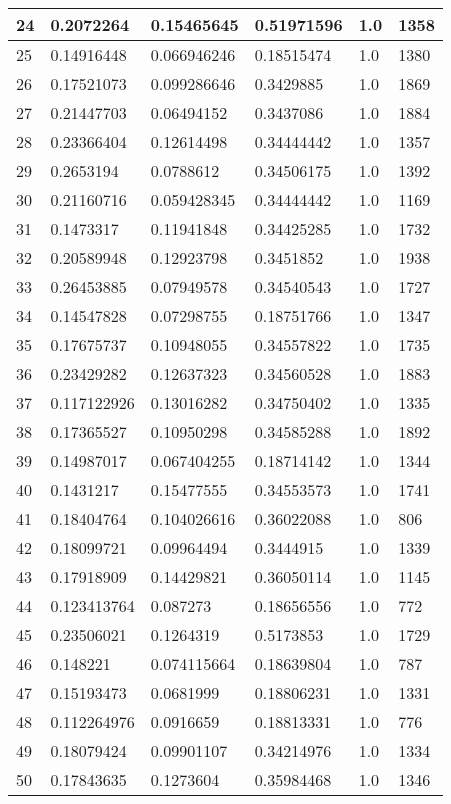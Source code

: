 \begin{longtable}{|l|l|l|l|l|l|}
24 & 0.2072264 & 0.15465645 & 0.51971596 & 1.0 & 1358 \\ \hline 
25 & 0.14916448 & 0.066946246 & 0.18515474 & 1.0 & 1380 \\ \hline 
26 & 0.17521073 & 0.099286646 & 0.3429885 & 1.0 & 1869 \\ \hline 
27 & 0.21447703 & 0.06494152 & 0.3437086 & 1.0 & 1884 \\ \hline 
28 & 0.23366404 & 0.12614498 & 0.34444442 & 1.0 & 1357 \\ \hline 
29 & 0.2653194 & 0.0788612 & 0.34506175 & 1.0 & 1392 \\ \hline 
30 & 0.21160716 & 0.059428345 & 0.34444442 & 1.0 & 1169 \\ \hline 
31 & 0.1473317 & 0.11941848 & 0.34425285 & 1.0 & 1732 \\ \hline 
32 & 0.20589948 & 0.12923798 & 0.3451852 & 1.0 & 1938 \\ \hline 
33 & 0.26453885 & 0.07949578 & 0.34540543 & 1.0 & 1727 \\ \hline 
34 & 0.14547828 & 0.07298755 & 0.18751766 & 1.0 & 1347 \\ \hline 
35 & 0.17675737 & 0.10948055 & 0.34557822 & 1.0 & 1735 \\ \hline 
36 & 0.23429282 & 0.12637323 & 0.34560528 & 1.0 & 1883 \\ \hline 
37 & 0.117122926 & 0.13016282 & 0.34750402 & 1.0 & 1335 \\ \hline 
38 & 0.17365527 & 0.10950298 & 0.34585288 & 1.0 & 1892 \\ \hline 
39 & 0.14987017 & 0.067404255 & 0.18714142 & 1.0 & 1344 \\ \hline 
40 & 0.1431217 & 0.15477555 & 0.34553573 & 1.0 & 1741 \\ \hline 
41 & 0.18404764 & 0.104026616 & 0.36022088 & 1.0 & 806 \\ \hline 
42 & 0.18099721 & 0.09964494 & 0.3444915 & 1.0 & 1339 \\ \hline 
43 & 0.17918909 & 0.14429821 & 0.36050114 & 1.0 & 1145 \\ \hline 
44 & 0.123413764 & 0.087273 & 0.18656556 & 1.0 & 772 \\ \hline 
45 & 0.23506021 & 0.1264319 & 0.5173853 & 1.0 & 1729 \\ \hline 
46 & 0.148221 & 0.074115664 & 0.18639804 & 1.0 & 787 \\ \hline 
47 & 0.15193473 & 0.0681999 & 0.18806231 & 1.0 & 1331 \\ \hline 
48 & 0.112264976 & 0.0916659 & 0.18813331 & 1.0 & 776 \\ \hline 
49 & 0.18079424 & 0.09901107 & 0.34214976 & 1.0 & 1334 \\ \hline 
50 & 0.17843635 & 0.1273604 & 0.35984468 & 1.0 & 1346 \\ \hline 
\end{longtable}